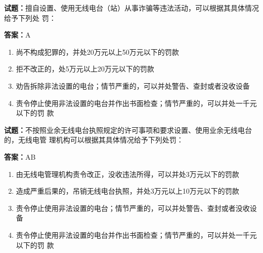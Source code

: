 \documentclass{ctexbook}
\begin{document}


\vspace{1em}

\textbf{试题：}擅自设置、使用无线电台（站）从事诈骗等违法活动，可以根据其具体情况给予下列处
罚： 

\textbf{答案：}A 

\begin{enumerate}[leftmargin=3em]
  \item 尚不构成犯罪的，并处20万元以上50万元以下的罚款 

  \item 拒不改正的，处5万元以上20万元以下的罚款 

  \item 劝告拆除非法设置的电台；情节严重的，可以并处警告、查封或者没收设备 

  \item 责令停止使用非法设置的电台并作出书面检查；情节严重的，可以并处一千元以下的罚
款 

\end{enumerate}





\vspace{1em}

\textbf{试题：}不按照业余无线电台执照规定的许可事项和要求设置、使用业余无线电台的，无线电管
理机构可以根据其具体情况给予下列处罚： 

\textbf{答案：}AB 

\begin{enumerate}[leftmargin=3em]
  \item 由无线电管理机构责令改正，没收违法所得，可以并处3万元以下的罚款 

  \item 造成严重后果的，吊销无线电台执照，并处3万元以上10万元以下的罚款 

  \item 责令停止使用非法设置的电台；情节严重的，可以并处警告、查封或者没收设备 

  \item 责令停止使用非法设置的电台并作出书面检查；情节严重的，可以并处一千元以下的罚
款 

\end{enumerate}





\vspace{1em}
\end{document}
